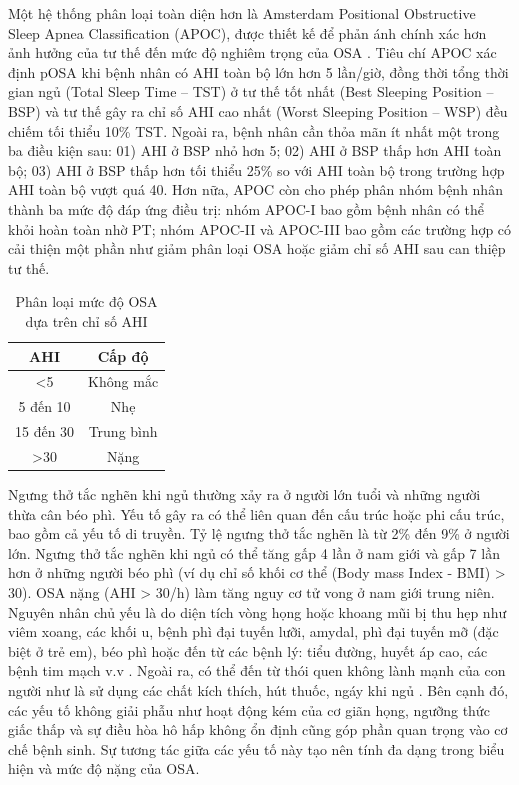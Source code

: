 Một hệ thống phân loại toàn diện hơn là Amsterdam Positional Obstructive Sleep
Apnea Classification (APOC), được thiết kế để phản ánh chính xác hơn ảnh hưởng
của tư thế đến mức độ nghiêm trọng của OSA \cite{frank2014positional}. Tiêu chí
APOC xác định pOSA khi bệnh nhân có AHI toàn bộ lớn hơn 5 lần/giờ, đồng thời
tổng thời gian ngủ (Total Sleep Time – TST) ở tư thế tốt nhất (Best Sleeping
Position – BSP) và tư thế gây ra chỉ số AHI cao nhất (Worst Sleeping Position –
WSP) đều chiếm tối thiểu 10\% TST. Ngoài ra, bệnh nhân cần thỏa mãn ít nhất một
trong ba điều kiện sau: 01) AHI ở BSP nhỏ hơn 5; 02) AHI ở BSP thấp hơn AHI
toàn bộ; 03) AHI ở BSP thấp hơn tối thiểu 25\% so với AHI toàn bộ trong trường
hợp AHI toàn bộ vượt quá 40. Hơn nữa, APOC còn cho phép phân nhóm bệnh nhân
thành ba mức độ đáp ứng điều trị: nhóm APOC-I bao gồm bệnh nhân có thể khỏi
hoàn toàn nhờ PT; nhóm APOC-II và APOC-III bao gồm các trường hợp có cải thiện
một phần như giảm phân loại OSA hoặc giảm chỉ số AHI sau can thiệp tư thế.

\begin{table}[h!]
  \caption{\texorpdfstring{Phân loại mức độ OSA dựa trên chỉ số AHI}{Phân loại OSA}}
  \label{ahi}
  \vspace{-3mm}
  \begin{center}
    \begin{tabular}{|c|c|}
      \hline
      AHI       & Cấp độ     \\
      \hline
      <5        & Không mắc  \\
      5 đến 10  & Nhẹ        \\
      15 đến 30 & Trung bình \\
      >30       & Nặng       \\
      \hline
    \end{tabular}
    \label{tab1}
  \end{center}
\end{table}

Ngưng thở tắc nghẽn khi ngủ thường xảy ra ở người lớn tuổi và những người thừa
cân béo phì. Yếu tố gây ra có thể liên quan đến cấu trúc hoặc phi cấu trúc, bao
gồm cả yếu tố di truyền. Tỷ lệ ngưng thở tắc nghẽn là từ 2\% đến 9\% ở người
lớn. Ngưng thở tắc nghẽn khi ngủ có thể tăng gấp 4 lần ở nam giới và gấp 7 lần
hơn ở những người béo phì (ví dụ chỉ số khối cơ thể (Body mass Index - BMI) >
30). OSA nặng (AHI > 30/h) làm tăng nguy cơ tử vong ở nam giới trung niên.
Nguyên nhân chủ yếu là do diện tích vòng họng hoặc khoang mũi bị thu hẹp như
viêm xoang, các khối u, bệnh phì đại tuyến lưỡi, amydal, phì đại tuyến mỡ (đặc
biệt ở trẻ em), béo phì hoặc đến từ các bệnh lý: tiểu đường, huyết áp cao, các
bệnh tim mạch v.v \cite{wright1997health}. Ngoài ra, có thể đến từ thói quen
không lành mạnh của con người như là sử dụng các chất kích thích, hút thuốc,
ngáy khi ngủ \cite{reason_osa}\cite{reasonOsa}. Bên cạnh đó, các yếu tố không
giải phẫu như hoạt động kém của cơ giãn họng, ngưỡng thức giấc thấp và sự điều
hòa hô hấp không ổn định cũng góp phần quan trọng vào cơ chế bệnh sinh. Sự
tương tác giữa các yếu tố này tạo nên tính đa dạng trong biểu hiện và mức độ
nặng của OSA.

